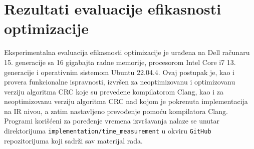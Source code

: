 \documentclass[12pt,oneside]{memoir}
\begin{document}


    
    




\section{Rezultati evaluacije efikasnosti optimizacije}


Eksperimentalna evaluacija efikasnosti optimizacije je urađena na Dell računaru 15. generacije sa 16 gigabajta radne memorije, procesorom Intel Core i7 13. generacije i operativnim sistemom Ubuntu 22.04.4. 
Ovaj postupak je, kao i provera funkcionalne ispravnosti, izvršen za neoptimizovanu i optimizovanu verziju algoritma CRC koje su prevedene kompilatorom Clang, kao i za neoptimizovanu verziju algoritma CRC nad kojom je pokrenuta implementacija na IR nivou, a zatim nastavljeno prevođenje pomoću kompilatora Clang. Programi korišćeni za poređenje vremena izvršavanja nalaze se unutar direktorijuma \texttt{implementation/time\_measurement} u okviru \texttt{GitHub} repozitorijuma koji sadrži sav materijal rada. 
\end{document}
